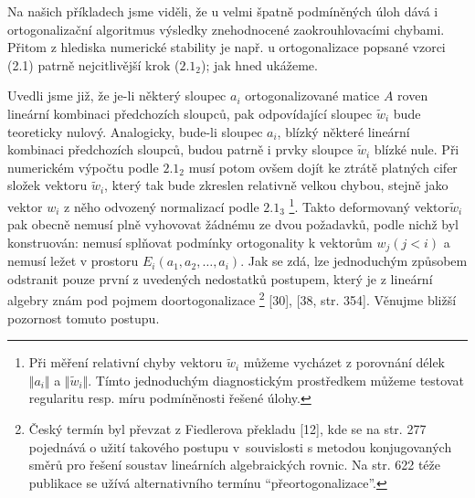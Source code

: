 

Na  našich příkladech jsme viděli, že u velmi špatně
podmíněných úloh dává i ortogonalizační algoritmus výsledky
znehodnocené zaokrouhlovacími chybami. Přitom z hlediska numerické stability
je např. u ortogonalizace popsané vzorci (2.1) patrně nejcitlivější
krok ($2.1_2$); jak hned ukážeme.

Uvedli jsme již, že je-li některý sloupec $a_i$ ortogonalizované
matice $A$ roven lineární kombinaci předchozích sloupců, pak
odpovídající sloupec $\widetilde w_i$ bude teoreticky
nulový. Analogicky, bude-li sloupec $a_i$, blízký některé lineární
kombinaci předchozích sloupců, budou patrně i prvky sloupce
$\widetilde w_i$ blízké nule. Při numerickém výpočtu podle $2.1_2$
musí potom ovšem dojít ke ztrátě platných cifer složek vektoru
$\widetilde w_i$, který tak bude zkreslen relativně velkou chybou,
stejně jako vektor $w_i$ z něho
odvozený normalizací podle
%
$2.1_3$%
  \footnote{%
%
Při měření relativní chyby vektoru $\widetilde w_i$ můžeme vycházet z
porovnání délek $\Vert a_i\Vert$ a $\Vert\widetilde w_i\Vert$. Tímto jednoduchým
diagnostickým prostředkem můžeme testovat regularitu resp. míru
podmíněnosti řešené úlohy.
%
}.
%
Takto deformovaný vektor$\widetilde w_i$ pak obecně nemusí plně
vyhovovat žádnému ze dvou požadavků, podle nichž byl konstruován:
nemusí splňovat podmínky ortogonality k vektorům $w_j (j<i)$ a nemusí
ležet v prostoru $E_i (a_1, a_2, \dots, a_i)$.
%
Jak se zdá, lze jednoduchým způsobem odstranit
pouze první z uvedených nedostatků postupem, který je z lineární
algebry znám pod pojmem doortogonalizace
%
\footnote{Český termín byl převzat z Fiedlerova překladu [12], kde
  se na str. 277 pojednává o užití takového postupu v~souvislosti s
  metodou konjugovaných směrů pro řešení soustav lineárních
  algebraických rovnic. Na str. 622 téže publikace se užívá
  alternativního termínu ``přeortogonalizace''.
}
%
[30], [38, str. 354].  Věnujme bližší pozornost tomuto postupu.


